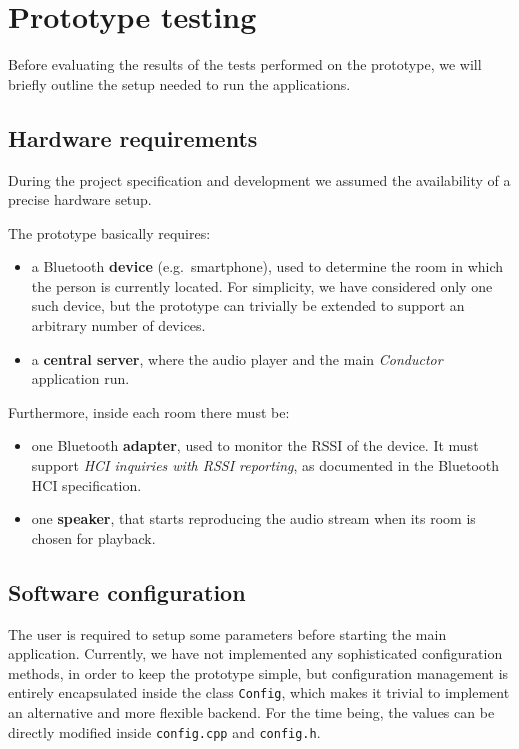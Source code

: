 \documentclass{IEEEtran}
\newcommand{\Conductor}{\textsl{Conductor}}
\begin{document}
\section{Prototype testing}
Before evaluating the results of the tests performed on the prototype, we will briefly outline the setup needed to run the applications.

\subsection{Hardware requirements}
\label{hwreqs}
During the project specification and development we assumed the availability of a precise hardware setup.

The prototype basically requires:
\begin{itemize}
	\item a Bluetooth \textbf{device} (e.g.\ smartphone), used to determine the room in which the person is currently located. For simplicity, we have considered only one such device, but the prototype can trivially be extended to support an arbitrary number of devices.
	\item a \textbf{central server}, where the audio player and the main \Conductor{} application run.
\end{itemize}
Furthermore, inside each room there must be:
\begin{itemize}
	\item one Bluetooth \textbf{adapter}, used to monitor the RSSI of the device. It must support \textit{HCI inquiries with RSSI reporting}, as documented in the Bluetooth HCI specification.
	\item one \textbf{speaker}, that starts reproducing the audio stream when its room is chosen for playback.
\end{itemize}

\subsection{Software configuration}
The user is required to setup some parameters before starting the main application. Currently, we have not implemented any sophisticated configuration methods, in order to keep the prototype simple, but configuration management is entirely encapsulated inside the class \texttt{Config}, which makes it trivial to implement an alternative and more flexible backend. For the time being, the values can be directly modified inside \texttt{config.cpp} and \texttt{config.h}.
\end{document}
